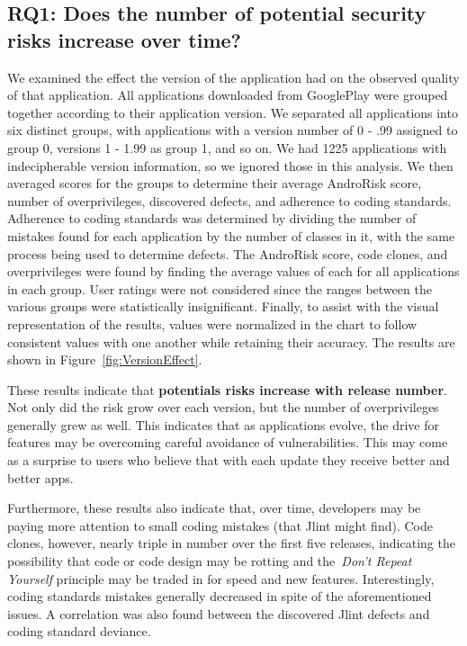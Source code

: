 \documentclass[conference]{IEEEtran}
\begin{document}
\subsection{RQ1: Does the number of potential security risks increase over time?}

We examined the effect the version of the application had on the observed quality of that application. All applications downloaded from GooglePlay were grouped together according to their application version. We separated all applications into six distinct groups, with applications with a version number of 0 - .99 assigned to group 0, versions 1 - 1.99 as group 1, and so on. We had 1225 applications with indecipherable version information, so we ignored those in this analysis. We then averaged scores for the groups to determine their average AndroRisk score, number of overprivileges,  discovered defects, and adherence to coding standards. Adherence to coding standards was determined by dividing the number of mistakes found for each application by the number of classes in it, with the same process being used to determine defects. The AndroRisk score, code clones, and overprivileges were found by finding the average values of each for all applications in each group. User ratings were not considered since the ranges between the various groups were statistically insignificant. Finally, to assist with the visual representation of the results, values were normalized in the chart to follow consistent values with one another while retaining their accuracy. The results are shown in Figure~\ref{fig:VersionEffect}.

These results indicate that \textbf{potentials risks increase with release number}. Not only did the risk grow over each version, but the number of overprivileges generally grew as well. This indicates that as applications evolve, the drive for features may be overcoming careful avoidance of vulnerabilities. This may come as a surprise to users who believe that with each update they receive better and better apps.

Furthermore, these results also indicate that, over time, developers may be paying more attention to small coding mistakes (that Jlint might find). Code clones, however, nearly triple in number over the first five releases, indicating the possibility that code or code design may be rotting and the~\emph{Don't Repeat Yourself} principle may be traded in for speed and new features. Interestingly, coding standards mistakes generally decreased in spite of the aforementioned issues. A correlation was also found between the discovered Jlint defects and coding standard deviance.
\end{document}
